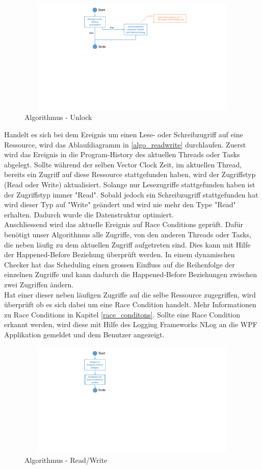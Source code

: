 \documentclass[10pt,a4paper]{article}
\begin{document}
\begin{flushleft}
\begin{figure}[H]
	\includegraphics[width=15cm,height=5.5cm,trim=70mm 110mm 50mm 5mm, clip]{images/Unlock.pdf}
\caption{Algorithmus - Unlock}\label{algo_unlock}
\end{figure}
Handelt es sich bei dem Ereignis um einen Lese- oder Schreibzugriff auf eine Ressource, wird das Ablaufdiagramm in \autoref{algo_readwrite} durchlaufen. Zuerst wird das Ereignis in die Program-History des aktuellen Threads oder Tasks abgelegt. Sollte während der selben Vector Clock Zeit, im aktuellen Thread, bereits ein Zugriff auf diese Ressource stattgefunden haben, wird der Zugriffstyp (Read oder Write) aktualisiert. Solange nur Lesezugriffe stattgefunden haben ist der Zugriffstyp immer "Read". Sobald jedoch ein Schreibzugriff stattgefunden hat wird dieser Typ auf "Write" geändert und wird nie mehr den Type "Read" erhalten. Dadurch wurde die Datenstruktur optimiert.\\
Anschliessend wird das aktuelle Ereignis auf Race Conditions geprüft. Dafür benötigt unser Algorithmus alle Zugriffe, von den anderen Threads oder Tasks, die neben läufig zu dem aktuellen Zugriff aufgetreten sind. Dies kann mit Hilfe der Happened-Before Beziehung überprüft werden. In einem dynamischen Checker hat das Scheduling einen grossen Einfluss auf die Reihenfolge der einzelnen Zugriffe und kann dadurch die Happened-Before Beziehungen zwischen zwei Zugriffen ändern.\\
Hat einer dieser neben läufigen Zugriffe auf die selbe Ressource zugegriffen, wird überprüft ob es sich dabei um eine Race Condition handelt. Mehr Informationen zu Race Conditions in Kapitel \ref{race_conditons}. Sollte eine Race Condition erkannt werden, wird diese mit Hilfe des Logging Frameworks NLog an die WPF Applikation gemeldet und dem Benutzer angezeigt.
\begin{figure}[H]
	\includegraphics[width=15cm,height=5.5cm,trim=70mm 108mm 50mm 7mm, clip]{images/ReadWrite.pdf}
\caption{Algorithmus - Read/Write}\label{algo_readwrite}
\end{figure}
\end{flushleft}
\end{document}
